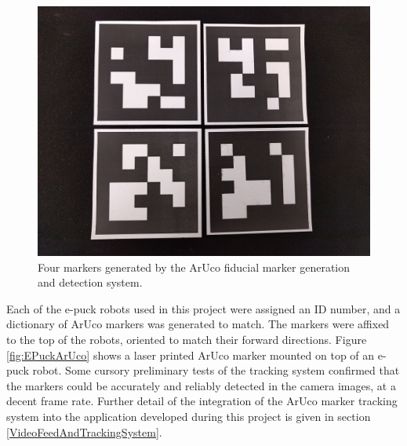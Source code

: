 \begin{figure}
	\centering
	\includegraphics[scale=0.4]{Figures/ARuCoTags.png}
	\decoRule
	\caption[ArUco Markers]{Four markers generated by the ArUco fiducial marker generation and detection system.}
	\label{fig:ArUcoTags}
\end{figure}

Each of the e-puck robots used in this project were assigned an ID number, and a dictionary of ArUco markers was generated to match. The markers were affixed to the top of the robots, oriented to match their forward directions. Figure \ref{fig:EPuckArUco} shows a laser printed ArUco marker mounted on top of an e-puck robot. Some cursory preliminary tests of the tracking system confirmed that the markers could be accurately and reliably detected in the camera images, at a decent frame rate. Further detail of the integration of the ArUco marker tracking system into the application developed during this project is given in section \ref{VideoFeedAndTrackingSystem}.

